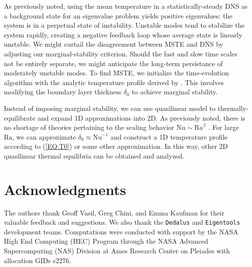 \documentclass[reprint,amsmath,amssymb,aps]{revtex4-1}
\newcommand\Ra{\mathrm{Ra}}
\newcommand\Nu{\mathrm{Nu}}
\newcommand{\eq}[1]{(\ref{#1})}
\begin{document}
As previously noted, using the mean temperature in a statistically-steady DNS as a background state for an eigenvalue problem yields positive eigenvalues: the system is in a perpetual state of instability. 
Unstable modes tend to stabilize the system rapidly, creating a negative feedback loop whose average state is linearly unstable. 
We might curtail the disagreement between MSTE and DNS by adjusting our marginal-stability criterion. 
Should the fast and slow time scales not be entirely separate, we might anticipate the long-term persistance of moderately unstable modes. 
To find MSTE, we initialize the time-evolution algorithm with the analytic temperature profile derived by \cite{Shishkina}.
This involves modifying the boundary layer thickness $\delta_0$ to achieve marginal stability.

Instead of imposing marginal stability, we can use quasilinear model to thermally-equilibrate and expand 1D approximations into 2D.
As previously noted, there is no shortage of theories pertaining to the scaling behavior $\Nu \sim \Ra^{\beta}$ \cite{Malkus_1954, Howard_1966, Kraichnan, Spiegel, Castaing, Grossman, Ahlers}.
For large $\Ra$, we can approximate $\delta_0 \approx \Nu^{-1}$ and construct a 1D temperature profile according to \eq{EQ:T0} or some other approximation.
In this way, other 2D quasilinear thermal equilibria can be obtained and analyzed. 

\section*{Acknowledgments}
The authors thank Geoff Vasil, Greg Chini, and Emma Kaufman for their valuable feedback and suggestions. 
We also thank the \texttt{Dedalus} and \texttt{Eigentools} development teams. 
Computations were conducted with support by the NASA High End Computing (HEC) Program through the NASA Advanced Supercomputing (NAS) Division at Ames Research Center on Pleiades with allocation GIDs s2276.

\appendix
\end{document}
